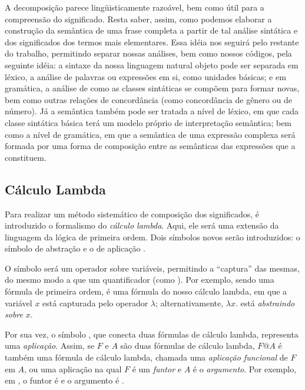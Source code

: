 A decomposição parece lingüisticamente razoável, bem como útil para a compreensão do significado. Resta saber, assim, como podemos elaborar a construção da semântica de uma frase completa a partir de tal análise sintática e dos significados dos termos mais elementares. Essa idéia nos seguirá pelo restante do trabalho, permitindo separar nossas análises, bem como nossos códigos, pela seguinte idéia: a sintaxe da nossa linguagem natural objeto pode ser separada em léxico, a análise de palavras ou expressões em si, como unidades básicas; e em gramática, a análise de como as classes sintáticas se compõem para formar novas, bem como outras relações de concordância (como concordância de gênero ou de número). Já a semântica também pode ser tratada a nível de léxico, em que cada classe sintática básica terá um modelo próprio de interpretação semântica; bem como a nível de gramática, em que a semântica de uma expressão complexa será formada por uma forma de composição entre as semânticas das expressões que a constituem.

\subsection{Cálculo Lambda}

Para realizar um método sistemático de composição dos significados, é introduzido o formalismo do \textit{cálculo lambda}. Aqui, ele será uma extensão da linguagem da lógica de primeira ordem. Dois símbolos novos serão introduzidos: o símbolo de abstração \expr{$\lambda$} e o de aplicação .

O símbolo \expr{$\lambda$} será um operador sobre variáveis, permitindo a ``captura'' das mesmas, do mesmo modo a que um quantificador (como \expr{$\forall$}). Por exemplo, sendo  uma fórmula de primeira ordem,  é uma fórmula do nosso cálculo lambda, em que a variável $x$ está capturada pelo operador $\lambda$; alternativamente, $\lambda x.$ está \textsl{abstraindo sobre} $x$. 

Por sua vez, o símbolo , que conecta duas fórmulas de cálculo lambda, representa uma \textit{aplicação}. Assim, se $F$ e $A$ são duas fórmulas de cálculo lambda, $F@A$ é também uma fórmula de cálculo lambda, chamada uma \textit{aplicação funcional} de $F$ em $A$, ou uma aplicação na qual $F$ é um \textsl{funtor} e $A$ é o \textsl{argumento}. Por exemplo, em , o funtor é  e o argumento é .

